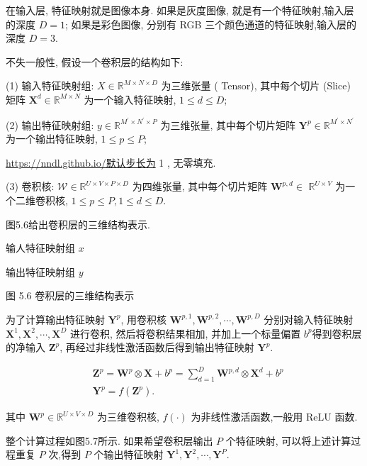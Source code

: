 \documentclass[10pt]{article}
\begin{document}
在输入层, 特征映射就是图像本身. 如果是灰度图像, 就是有一个特征映射,输入层的深度 $D=1$; 如果是彩色图像, 分别有 RGB 三个颜色通道的特征映射,输入层的深度 $D=3$.

不失一般性, 假设一个卷积层的结构如下:

(1) 输入特征映射组: $X \in \mathbb{R}^{M \times N \times D}$ 为三维张量 ( Tensor), 其中每个切片 (Slice) 矩阵 $\boldsymbol{X}^{d} \in \mathbb{R}^{M \times N}$ 为一个输入特征映射, $1 \leq d \leq D$;

(2) 输出特征映射组: $y \in \mathbb{R}^{M^{\prime} \times N^{\prime} \times P}$ 为三维张量, 其中每个切片矩阵 $\boldsymbol{Y}^{p} \in \mathbb{R}^{M^{\prime} \times N^{\prime}}$ 为一个输出特征映射, $1 \leq p \leq P$;

\href{https://nndl.github.io/%E9%BB%98%E8%AE%A4%E6%AD%A5%E9%95%BF%E4%B8%BA}{https://nndl.github.io/默认步长为} 1 , 无零填充.

(3) 卷积核: $\mathcal{W} \in \mathbb{R}^{U \times V \times P \times D}$ 为四维张量, 其中每个切片矩阵 $\boldsymbol{W}^{p, d} \in$ $\mathbb{R}^{U \times V}$ 为一个二维卷积核, $1 \leq p \leq P, 1 \leq d \leq D$.

图5.6给出卷积层的三维结构表示.



输人特征映射组 $x$



输出特征映射组 $y$

图 5.6 卷积层的三维结构表示

为了计算输出特征映射 $\boldsymbol{Y}^{p}$, 用卷积核 $\boldsymbol{W}^{p, 1}, \boldsymbol{W}^{p, 2}, \cdots, \boldsymbol{W}^{p, D}$ 分别对输入特征映射 $\boldsymbol{X}^{1}, \boldsymbol{X}^{2}, \cdots, \boldsymbol{X}^{D}$ 进行卷积, 然后将卷积结果相加, 并加上一个标量偏置 $b^{p}$得到卷积层的净输入 $\boldsymbol{Z}^{p}$, 再经过非线性激活函数后得到输出特征映射 $\boldsymbol{Y}^{p}$.


\begin{align*}
& \boldsymbol{Z}^{p}=\boldsymbol{W}^{p} \otimes \boldsymbol{X}+b^{p}=\sum_{d=1}^{D} \boldsymbol{W}^{p, d} \otimes \boldsymbol{X}^{d}+b^{p}  \tag{5.23}\\
& \boldsymbol{Y}^{p}=f\left(\boldsymbol{Z}^{p}\right) . \tag{5.24}
\end{align*}


其中 $\boldsymbol{W}^{p} \in \mathbb{R}^{U \times V \times D}$ 为三维卷积核, $f(\cdot)$ 为非线性激活函数,一般用 $\mathrm{ReLU}$ 函数.

整个计算过程如图5.7所示. 如果希望卷积层输出 $P$ 个特征映射, 可以将上述计算过程重复 $P$ 次,得到 $P$ 个输出特征映射 $\boldsymbol{Y}^{1}, \boldsymbol{Y}^{2}, \cdots, \boldsymbol{Y}^{P}$.
\end{document}
